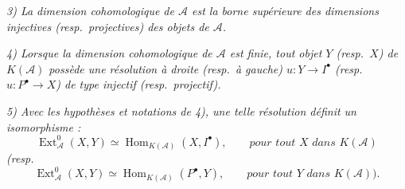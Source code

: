 \noindent\textit{3) La dimension cohomologique de $\mathcal A$ est la borne
supérieure des dimensions injectives (resp.\ projectives) des objets de
$\mathcal A$.}

\noindent\textit{4) Lorsque la dimension cohomologique de $\mathcal A$ est
finie, tout objet $Y$ (resp.\ $X$) de $K(\mathcal A)$ possède une résolution
à droite (resp.\ à gauche) $u\colon Y\longrightarrow I^\bullet$ (resp.\
$u\colon P^\bullet\longrightarrow X$) de type injectif (resp.\ projectif).}

\noindent\textit{5) Avec les hypothèses et notations de 4), une telle
résolution définit un isomorphisme :}
\[
\operatorname{Ext}_{\mathcal A}^{0}(X,Y)\simeq
\operatorname{Hom}_{K(\mathcal A)}(X,I^\bullet),
\qquad\textit{pour tout $X$ dans $K(\mathcal A)$}
\]
\noindent\textit{(resp.\ }
\[
\operatorname{Ext}_{\mathcal A}^{0}(X,Y)\simeq
\operatorname{Hom}_{K(\mathcal A)}(P^\bullet,Y),
\qquad\textit{pour tout $Y$ dans $K(\mathcal A)$).}
\]
\endgroup
